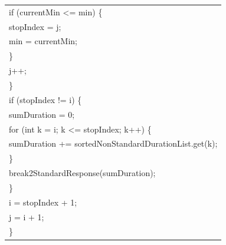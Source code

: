 \documentclass[a4paper, 13pt]{report}
\begin{document}
\begin{enumerate}[label=\textbf{PL\arabic*}]
\begin{flushleft}
\begin{tabular}{ |l| }
\hspace{1.5cm}   if (currentMin <= min) \{\\
\hspace{2cm}       stopIndex = j;\\
\hspace{2cm}       min = currentMin;\\
\hspace{1.5cm}    \}\\
\hspace{1.5cm}   j++;\\
\hspace{1cm} \}\\
\hspace{1cm}  if (stopIndex != i) \{\\
\hspace{1.5cm}     sumDuration = 0;\\
\hspace{1.5cm}     for (int k = i; k <= stopIndex; k++) \{\\
\hspace{2cm}         sumDuration += sortedNonStandardDurationList.get(k);\\
\hspace{1.5cm}     \}\\  
\hspace{1.5cm}     break2StandardResponse(sumDuration);  \\            
\hspace{1cm}   \}\\
\hspace{1cm}     i = stopIndex + 1;\\
\hspace{1cm}     j = i + 1;\\
\hspace{0.5cm} \}\\
\hline
\end{tabular}
\end{flushleft}


\end{enumerate}
\end{document}
